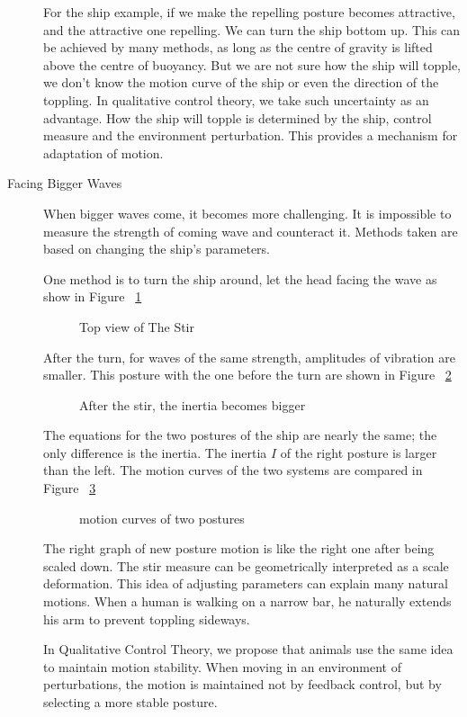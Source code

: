 \begin{description}
For the ship example, if we make the repelling posture becomes attractive, and the attractive one repelling.
We can turn the ship bottom up.
This can be achieved by many methods, as long as the centre of gravity is lifted above the centre of buoyancy.
But we are not sure how the ship will topple, 
we don't know the motion curve of the ship or even the direction of the toppling. 
In qualitative control theory, we take such uncertainty as an advantage.
How the ship will topple is determined by the ship, control measure and the environment perturbation.
This provides a mechanism for adaptation of motion.



\item[Facing Bigger Waves]
When bigger waves come, it becomes more challenging.
It is impossible to measure the strength of coming wave and counteract it. 
Methods taken are based on changing the ship's parameters.

One method is to turn the ship around, let the head facing the wave as show in Figure ~\ref{fig:ship_stir}
\begin{figure}
%
\caption{Top view of The Stir}
\label{fig:ship_stir}
\end{figure}

After the turn, for waves of the same strength, amplitudes of vibration are smaller.
This posture with the one before the turn are shown in Figure ~\ref{fig:ship_stir2D}
\begin{figure}
%
\caption{After the stir, the inertia becomes bigger}
\label{fig:ship_stir2D}
\end{figure}
The equations for the two postures of the ship are nearly the same; the only difference is the inertia.
The inertia $I$ of the right posture is larger than the left.
The motion curves of the two systems are compared in Figure ~\ref{fig:more_stable}
\begin{figure}
%
\caption{motion curves of two postures}
\label{fig:more_stable}
\end{figure}

The right graph of new posture motion is like the right one after being scaled down.
The stir measure can be geometrically interpreted as a scale deformation. 
This idea of adjusting parameters can explain many natural motions.
When a human is walking on a narrow bar, he naturally extends his arm to prevent toppling sideways.

In Qualitative Control Theory, we propose that animals use the same idea to maintain motion stability.
When moving in an environment of perturbations, 
the motion is maintained not by feedback control, 
but by selecting a more stable posture.


\end{description}
